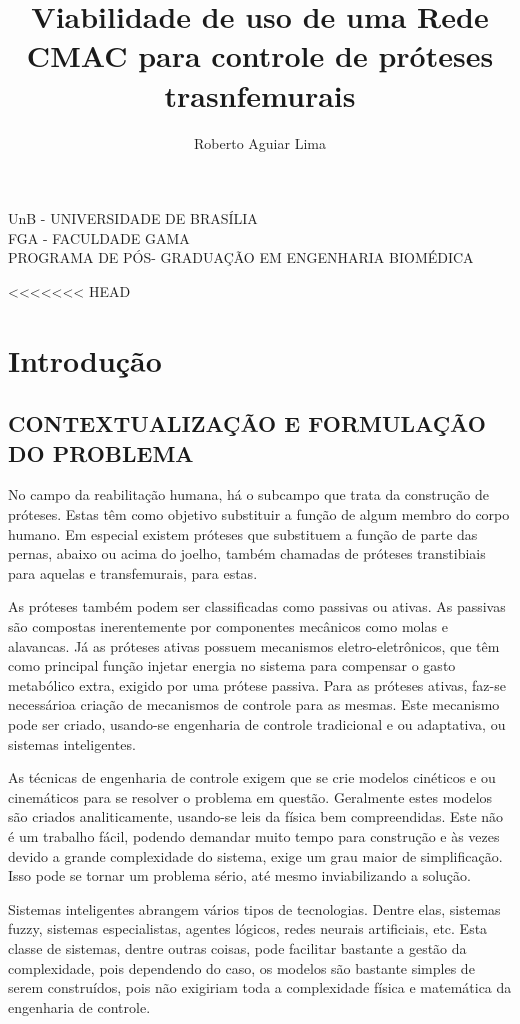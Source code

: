 \documentclass[a4paper, 12pt] {report}
\title{Viabilidade de uso de uma Rede CMAC para controle de pr\'oteses trasnfemurais}
\author{Roberto Aguiar Lima}
\begin{document}
	\begin{center}
		UnB - UNIVERSIDADE DE BRAS\'ILIA\\
		FGA - FACULDADE GAMA\\
		PROGRAMA DE P\'OS- GRADUA\c{C}\~AO EM ENGENHARIA BIOM\'EDICA
	\end{center}
	\maketitle
<<<<<<< HEAD
	
	\chapter{Introdução}
		\section {CONTEXTUALIZAÇÃO E FORMULAÇÃO DO PROBLEMA}

No campo da reabilitação humana, há o subcampo que trata da construção de próteses. Estas têm como objetivo substituir a função de algum membro do corpo humano. Em especial existem próteses que substituem a função de parte das pernas, abaixo ou acima do joelho, também chamadas de próteses transtibiais para aquelas e transfemurais, para estas.

	As próteses também podem ser classificadas como passivas ou ativas. As passivas são compostas inerentemente por componentes mecânicos como molas e alavancas. Já as próteses ativas possuem mecanismos eletro-eletrônicos, que têm como principal função injetar energia no sistema para compensar o gasto metabólico extra, exigido por uma prótese passiva. Para as próteses ativas, faz-se necessárioa criação de mecanismos de controle para as mesmas. Este mecanismo pode ser criado, usando-se engenharia de controle tradicional e ou adaptativa, ou sistemas inteligentes.

	As técnicas de engenharia de controle exigem que se crie modelos cinéticos e ou cinemáticos para se resolver o problema em questão. Geralmente estes modelos são criados analiticamente, usando-se leis da física bem compreendidas. Este não é um trabalho fácil, podendo demandar muito tempo para construção e às vezes devido a grande complexidade do sistema, exige um grau maior de simplificação. Isso pode se tornar um problema sério, até mesmo inviabilizando a solução.

	Sistemas inteligentes abrangem vários tipos de tecnologias. Dentre elas, sistemas fuzzy, sistemas especialistas, agentes lógicos, redes neurais artificiais, etc. Esta classe de sistemas, dentre outras coisas, pode facilitar bastante a gestão da complexidade, pois dependendo do caso, os modelos são bastante simples de serem construídos, pois não exigiriam toda a complexidade física e matemática da engenharia de controle.
\end{document}
